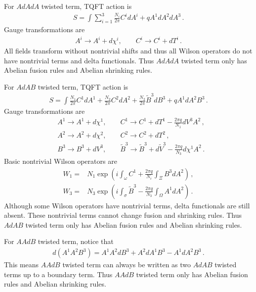 \documentclass[11pt,nofootinbib,preprint]{revtex4-1}
\begin{document}
For $AdAdA$ twisted term, TQFT action is
\begin{align}
	S=\int{\sum_{i=1}^3{\frac{N_i}{2\pi}C^idA^i+qA^1dA^2dA^3}}\,.
\end{align}
Gauge transformations are 
\begin{align}
	A^i\rightarrow A^i+d\chi ^i,\qquad C^i\rightarrow C^i+dT^i\,.
\end{align}
All fields transform without nontrivial shifts and thus all Wilson operators do not have nontrivial terms and delta functionals. Thus $AdAdA$ twisted term only has Abelian fusion rules and Abelian shrinking rules.

For $AdAB$ twisted term, TQFT action is
\begin{align}
	S=\int{\frac{N_1}{2\pi}C^1dA^1+\frac{N_2}{2\pi}C^2dA^2+\frac{N_2}{2\pi}\tilde{B}^3dB^3+qA^1dA^2B^3}\,.
\end{align}
Gauge transformations are 
\begin{align}
	&A^1\rightarrow A^1+d\chi ^1,\qquad C^1\rightarrow C^1+dT^1-\frac{2\pi q}{N_1}dV^3A^2 \,,\nonumber
	\\
	&A^2\rightarrow A^2+d\chi ^2,\qquad C^2\rightarrow C^2+dT^2 \,,\nonumber
	\\
	&B^3\rightarrow B^3+dV^3,\qquad \tilde{B}^3\rightarrow \tilde{B}^3+d\tilde{V}^3-\frac{2\pi q}{N_3}d\chi ^1A^2\,.
\end{align}
Basic nontrivial Wilson operators are
\begin{align}
	W_1=&N_1\exp \left( i\int_{\omega}{C^1+\frac{2\pi q}{N_i}}\int_{\Xi}{B^3dA^2} \right) \,,\nonumber
	\\
	W_3=&N_3\exp \left( i\int_{\sigma}{\tilde{B}^3-\frac{2\pi q}{N_3}}\int_{\Omega}{A^1dA^2} \right) \,.
\end{align}
Although some Wilson operators have nontrivial terms, delta functionals are still absent. These nontrivial terms cannot change fusion and shrinking rules. Thus $AdAB$ twisted term only has Abelian fusion rules and Abelian shrinking rules.

For $AAdB$ twisted term, notice that 
\begin{align}
	d\left( A^1A^2B^3 \right) =A^1A^2dB^3+A^2dA^1B^3-A^1dA^2B^3\,.
\end{align}
This means $AAdB$ twisted term can always be written as two $AdAB$ twisted terms up to a boundary term. Thus $AAdB$ twisted term only has Abelian fusion rules and Abelian shrinking rules.

%
\end{document}
